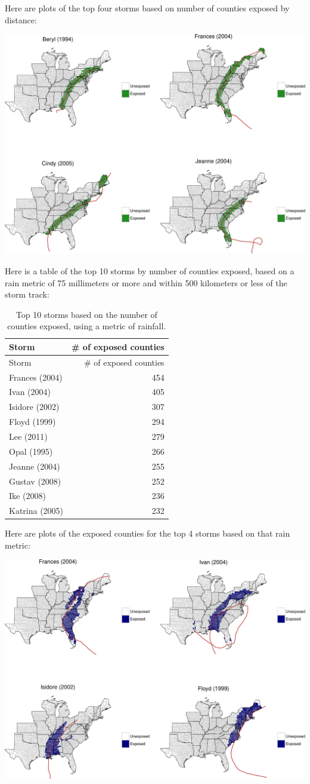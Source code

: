 \documentclass[]{elsarticle} %
\makeatletter
\def\maxwidth{\ifdim\Gin@nat@width>\linewidth\linewidth
\else\Gin@nat@width\fi}
\let\Oldincludegraphics\includegraphics
\renewcommand{\includegraphics}[1]{\Oldincludegraphics[width=\maxwidth]{#1}}
\makeatother
\begin{document}
Here are plots of the top four storms based on number of counties
exposed by distance:

\includegraphics{DraftExposurePaper_files/figure-latex/unnamed-chunk-10-1.pdf}

Here is a table of the top 10 storms by number of counties exposed,
based on a rain metric of 75 millimeters or more and within 500
kilometers or less of the storm track:

\begin{longtable}[]{@{}lr@{}}
\caption{Top 10 storms based on the number of counties exposed, using a
metric of rainfall.}\tabularnewline
\toprule
Storm & \# of exposed counties\tabularnewline
\midrule
\endfirsthead
\toprule
Storm & \# of exposed counties\tabularnewline
\midrule
\endhead
Frances (2004) & 454\tabularnewline
Ivan (2004) & 405\tabularnewline
Isidore (2002) & 307\tabularnewline
Floyd (1999) & 294\tabularnewline
Lee (2011) & 279\tabularnewline
Opal (1995) & 266\tabularnewline
Jeanne (2004) & 255\tabularnewline
Gustav (2008) & 252\tabularnewline
Ike (2008) & 236\tabularnewline
Katrina (2005) & 232\tabularnewline
\bottomrule
\end{longtable}

Here are plots of the exposed counties for the top 4 storms based on
that rain metric:

\includegraphics{DraftExposurePaper_files/figure-latex/unnamed-chunk-12-1.pdf}
\end{document}
